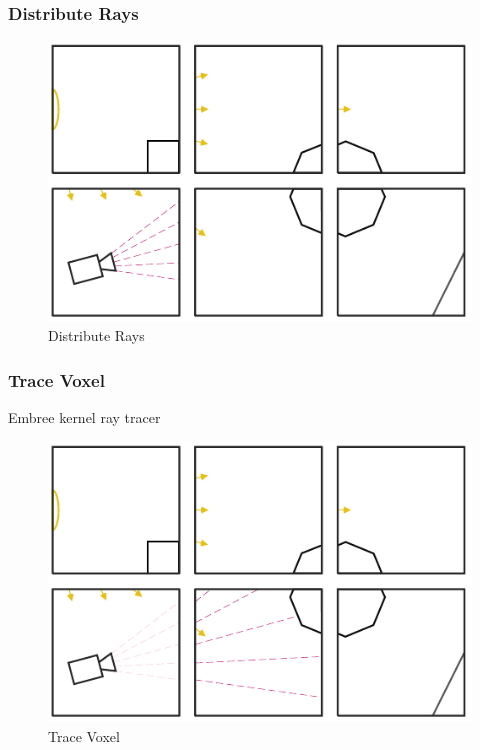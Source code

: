 \documentclass{vgtc}                          %
\begin{document}
\subsubsection{Distribute Rays}

\begin{figure}[htb]
  \centering
  \includegraphics[width=\columnwidth]{./../img/Trace1.pdf}
  \caption{Distribute Rays}
\end{figure}

\subsubsection{Trace Voxel}
Embree kernel ray tracer

\begin{figure}[htb]
  \centering
  \includegraphics[width=\columnwidth]{./../img/Trace2.pdf}
  \caption{Trace Voxel}
\end{figure}
\end{document}
